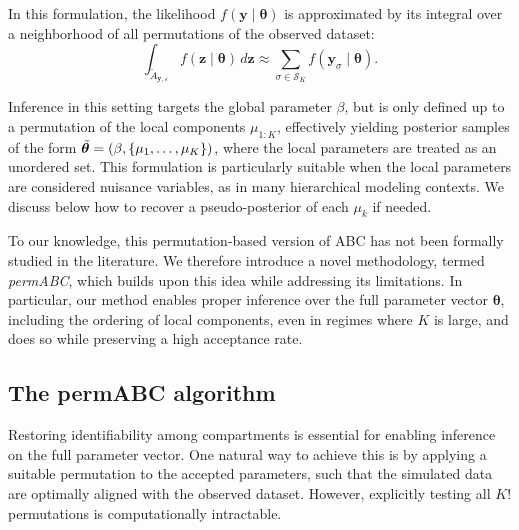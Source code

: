 \documentclass[lineno]{biometrika}
\def\globparam{\beta}
\def\locparam{\mu}
\def\obsdata{\mathbf{y}}
\def\param{\boldsymbol{\theta}}
\def\simdata{\mathbf{z}}
\def\xian#1{\textcolor{orange}{\textit{// X: #1}}}
\begin{document}
In this formulation, the likelihood \( f(\obsdata \mid \param) \) is approximated by its integral over a neighborhood of all permutations of the observed dataset:
\[
\int_{\tilde{A}_{\obsdata,\varepsilon}} f(\simdata \mid \param) \, d\simdata \approx \sum_{\sigma \in \mathcal{S}_K} f(\obsdata_{\sigma} \mid \param).
\]

Inference in this setting targets the global parameter \( \globparam \), but is only defined up to a permutation of the local components \( \locparam_{1:K} \), effectively yielding posterior samples of the form \( \Tilde{\param} = (\globparam, \{\locparam_1, \dots, \locparam_K\})\),
where the local parameters are treated as an unordered set. This formulation is particularly suitable when the local parameters are considered nuisance variables, as in many hierarchical modeling contexts. We discuss below how to recover a pseudo-posterior of each $\mu_k$ if needed.

To our knowledge, this permutation-based version of ABC has not been formally studied in the literature. We therefore introduce a novel methodology, termed \emph{permABC}, which builds upon this idea while addressing its limitations. In particular, our method enables proper inference over the full parameter vector \( \param \), including the ordering of local components, even in regimes where \( K \) is large, and does so while preserving a high acceptance rate.






\subsection{The permABC algorithm}
\label{secpermabc_star}


Restoring identifiability among compartments is essential for enabling inference on the full parameter vector. One natural way to achieve this is by applying a suitable permutation to the accepted parameters, such that the simulated data are optimally aligned with the observed dataset. However, explicitly testing all \( K! \) permutations is computationally intractable.
\end{document}
